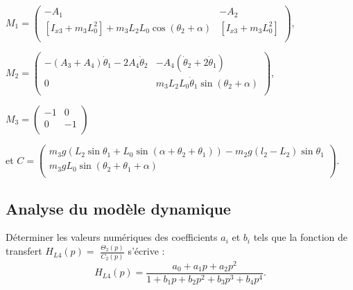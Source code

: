 \documentclass[11pt]{article}
\begin{document}
\begin{UPSTIcorrige}
$M_1 = \begin{pmatrix}
-A_1 & - A_2 \\
\left[I_{x 3}+m_{3} L_{0}^{2}\right]  +m_{3} L_{2} L_{0}\cos \left(\theta_{2}+\alpha\right) & \left[I_{x 3}+m_{3} L_{0}^{2}\right] \\
\end{pmatrix}$,

$M_2 = \begin{pmatrix}
-\left(A_{3}+A_4\right) \dot{\theta}_{1}-2A_4 \dot{\theta}_2  & -A_4\left(\dot{\theta}_2+2\dot{\theta}_1\right) \\
0 & m_{3} L_{2} L_{0} \dot{\theta}_{1} \sin \left(\theta_{2}+\alpha\right) \\
\end{pmatrix}$, 

$M_3 = \begin{pmatrix}
- 1 & 0 \\
0 & - 1  \\
\end{pmatrix}$

et 
$C = \begin{pmatrix}
 m_3 g\left(  L_2 \sin \theta_1 +  L_0 \sin\left( \alpha + \theta_2 + \theta_1\right)\right) - m_2 g\left( l_2 - L_2\right) \sin \theta_1 \\
m_{3} g L_{0} \sin \left(\theta_{2}+\theta_{1}+\alpha\right) \\
\end{pmatrix}$.



\end{UPSTIcorrige}


\subsection{Analyse du modèle dynamique}

\UPSTIquestion Déterminer les valeurs numériques des coefficients $a_{i}$ et $b_{i}$ tels que la fonction de transfert $H_{L 4}(p)=$ $\frac{\Theta_{2}(p)}{C_{2}(p)}$ s'écrive :
$$
H_{L 4}(p)=\frac{a_{0}+a_{1} p+a_{2} p^{2}}{1+b_{1} p+b_{2} p^{2}+b_{3} p^{3}+b_{4} p^{4}}.
$$
\end{document}
